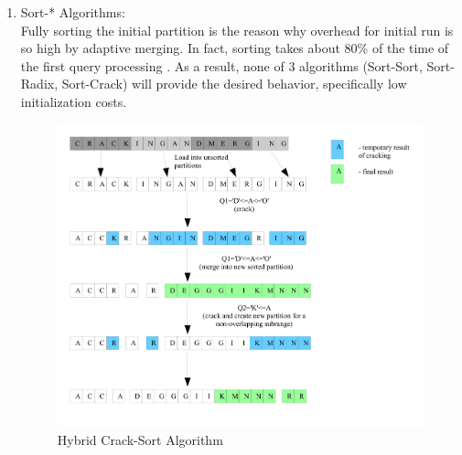 \documentclass[10pt, conference, compsocconf]{IEEEtran}
\begin{document}
\begin{enumerate}
\item{Sort-* Algorithms:} \\
Fully sorting the initial partition is the reason why overhead for initial run is so high by adaptive merging. In fact, sorting takes about 80\% of the time of the first query processing \cite{hybrid}. As a result, none of 3 algorithms (Sort-Sort, Sort-Radix, Sort-Crack) will provide the desired behavior, specifically low initialization costs.\\

\begin{figure}[h]
\centering
\includegraphics[width=\columnwidth]{hcs.png}
\caption{Hybrid Crack-Sort Algorithm}
\end{figure}


\end{enumerate}
\end{document}
